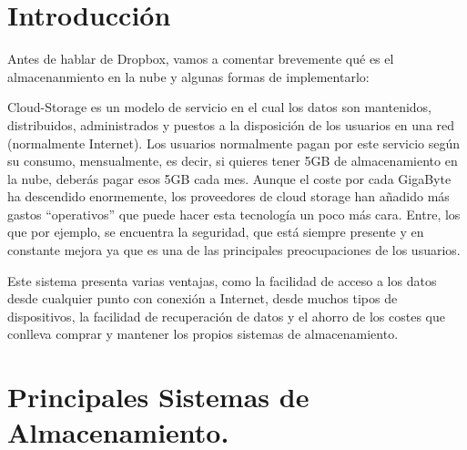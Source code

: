 \begin{titlepage}




 

\vfill %

\end{titlepage}

\tableofcontents
\newpage

\section{Introducción}

Antes de hablar de Dropbox, vamos a comentar brevemente qué es el almacenanmiento en la nube y algunas formas de implementarlo:

Cloud-Storage es un modelo de servicio en el cual los datos son mantenidos, distribuidos, administrados y puestos a la disposición de los usuarios en una red (normalmente Internet). Los usuarios normalmente pagan por este servicio según su consumo, mensualmente, es decir, si quieres tener 5GB de almacenamiento en la nube, deberás pagar esos 5GB cada mes. 
Aunque el coste por cada GigaByte ha descendido enormemente, los proveedores de cloud storage han añadido más gastos “operativos” que puede hacer esta tecnología un poco más cara. Entre, los que por ejemplo, se encuentra la seguridad, que está siempre presente y en constante mejora ya que es una de las principales preocupaciones de los usuarios.

Este sistema presenta varias ventajas, como la facilidad de acceso a los datos desde cualquier punto con conexión a Internet, desde muchos tipos de dispositivos, la facilidad de recuperación de datos y el ahorro de los costes que conlleva comprar y mantener los propios sistemas de almacenamiento.

\section{Principales Sistemas de Almacenamiento.}

